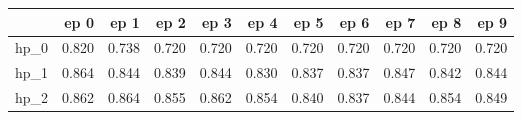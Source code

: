 \begin{tabular}{lrrrrrrrrrr}
\toprule
{} &   ep 0 &   ep 1 &   ep 2 &   ep 3 &   ep 4 &   ep 5 &   ep 6 &   ep 7 &   ep 8 &   ep 9 \\
\midrule
hp\_0 &  0.820 &  0.738 &  0.720 &  0.720 &  0.720 &  0.720 &  0.720 &  0.720 &  0.720 &  0.720 \\
hp\_1 &  0.864 &  0.844 &  0.839 &  0.844 &  0.830 &  0.837 &  0.837 &  0.847 &  0.842 &  0.844 \\
hp\_2 &  0.862 &  0.864 &  0.855 &  0.862 &  0.854 &  0.840 &  0.837 &  0.844 &  0.854 &  0.849 \\
\bottomrule
\end{tabular}
